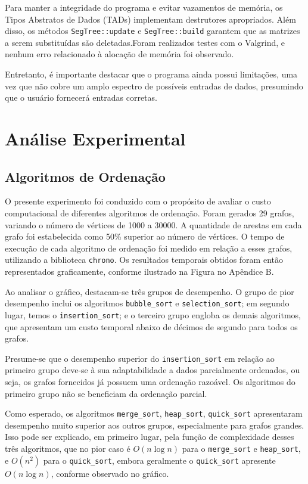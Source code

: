 \documentclass{article}
\begin{document}
Para manter a integridade do programa e evitar vazamentos de memória, os Tipos Abstratos de Dados (TADs) implementam destrutores apropriados. Além disso, os métodos \texttt{SegTree::update} e  \texttt{SegTree::build} garantem que as matrizes a serem substituídas são deletadas.Foram realizados testes com o Valgrind, e nenhum erro relacionado à alocação de memória foi observado.

Entretanto, é importante destacar que o programa ainda possui limitações, uma vez que não cobre um amplo espectro de possíveis entradas de dados, presumindo que o usuário fornecerá entradas corretas. 


\section{Análise Experimental}

\subsection{Algoritmos de Ordenação}
O presente experimento foi conduzido com o propósito de avaliar o custo computacional de diferentes algoritmos de ordenação. Foram gerados 29 grafos, variando o número de vértices de 1000 a 30000. A quantidade de arestas em cada grafo foi estabelecida como 50\% superior ao número de vértices. O tempo de execução de cada algoritmo de ordenação foi medido em relação a esses grafos, utilizando a biblioteca \texttt{chrono}. Os resultados temporais obtidos foram então representados graficamente, conforme ilustrado na Figura no Apêndice B.



Ao analisar o gráfico, destacam-se três grupos de desempenho. O grupo de pior desempenho inclui os algoritmos \texttt{bubble\_sort} e \texttt{selection\_sort}; em segundo lugar, temos o \texttt{insertion\_sort}; e o terceiro grupo engloba os demais algoritmos, que apresentam um custo temporal abaixo de décimos de segundo para todos os grafos.

Presume-se que o desempenho superior do \texttt{insertion\_sort} em relação ao primeiro grupo deve-se à sua adaptabilidade a dados parcialmente ordenados, ou seja, os grafos fornecidos já possuem uma ordenação razoável. Os algoritmos do primeiro grupo não se beneficiam da ordenação parcial.

Como esperado, os algoritmos \texttt{merge\_sort}, \texttt{heap\_sort}, \texttt{quick\_sort} apresentaram desempenho muito superior aos outros grupos, especialmente para grafos grandes. Isso pode ser explicado, em primeiro lugar, pela função de complexidade desses três algoritmos, que no pior caso é \(O(n \log n)\) para o \texttt{merge\_sort} e \texttt{heap\_sort}, e \(O(n^2)\) para o \texttt{quick\_sort}, embora geralmente o \texttt{quick\_sort} apresente \(O(n \log n)\), conforme observado no gráfico.
\end{document}
